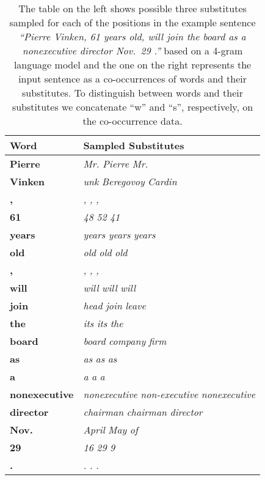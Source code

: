 \begin{table}[h]
\caption{The table on the left shows possible three substitutes
  sampled for each of the positions in the example sentence
  \textit{``Pierre Vinken, 61 years old, will join the board as a
    nonexecutive director Nov.~29 .''} based on a 4-gram language
  model and the one on the right represents the input sentence as a
  co-occurrences of words and their substitutes.  To distinguish
  between words and their substitutes we concatenate ``w'' and ``s'',
  respectively, on the co-occurrence data.}
\begin{tabular}{|ll|} \hline
\textbf{Word} & \textbf{Sampled Substitutes}\\
\hline
\textbf{Pierre} & \textit{Mr.}  \textit{Pierre}  \textit{Mr.}\\
\textbf{Vinken} & \textit{unk}  \textit{Beregovoy}  \textit{Cardin}\\
\textbf{,} & \textit{,}  \textit{,}  \textit{,}\\
\textbf{61} & \textit{48}  \textit{52}  \textit{41}\\
\textbf{years} & \textit{years}  \textit{years}  \textit{years}\\
\textbf{old} & \textit{old}  \textit{old}  \textit{old}\\
\textbf{,} & \textit{,}  \textit{,}  \textit{,}\\
\textbf{will} & \textit{will}  \textit{will}  \textit{will}\\
\textbf{join} & \textit{head}  \textit{join}  \textit{leave}\\
\textbf{the}  & \textit{its}  \textit{its}  \textit{the}\\
\textbf{board} & \textit{board}  \textit{company}  \textit{firm}\\
\textbf{as} & \textit{as}  \textit{as}  \textit{as}\\
\textbf{a} & \textit{a}  \textit{a}  \textit{a}\\
\textbf{nonexecutive} & \textit{nonexecutive}  \textit{non-executive}  \textit{nonexecutive}\\
\textbf{director} & \textit{chairman}  \textit{chairman}  \textit{director}\\
\textbf{Nov.} & \textit{April}  \textit{May}  \textit{of}\\
\textbf{29} & \textit{16}  \textit{29}  \textit{9}\\
\textbf{.} & \textit{.}  \textit{.}  \textit{.}\\
\hline
\end{tabular}

\end{table}
